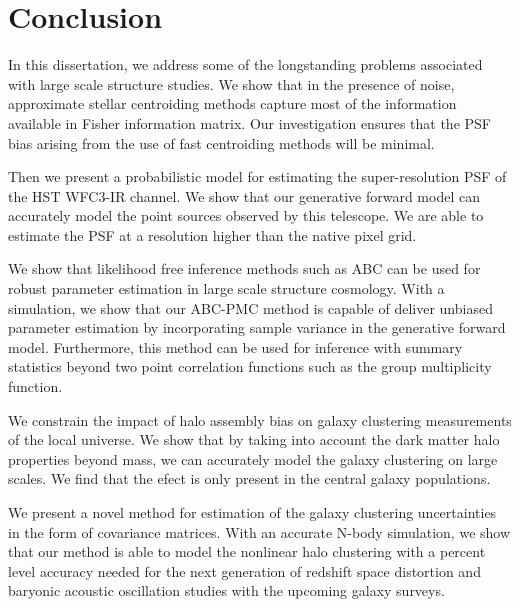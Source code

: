 \chapter*{Conclusion}

In this dissertation, we address some of the longstanding problems associated with large scale structure studies.
We show that in the presence of noise, approximate stellar centroiding methods capture most of the 
information available in Fisher information matrix. Our investigation ensures that the PSF bias arising 
from the use of fast centroiding methods will be minimal. 

Then we present a probabilistic model for estimating the super-resolution PSF of the HST WFC3-IR channel.
We show that our generative forward model can accurately model the point sources observed by this telescope. We are able 
to estimate the PSF at a resolution higher than the native pixel grid.

We show that likelihood free inference methods such as ABC can be used for robust parameter estimation 
in large scale structure cosmology. With a simulation, we show that our ABC-PMC method is capable of deliver unbiased 
parameter estimation by incorporating sample variance in the generative forward model. Furthermore, this method can be used 
for inference with summary statistics beyond two point correlation functions such as the group multiplicity function.

We constrain the impact of halo assembly bias on galaxy clustering measurements of the local universe. 
We show that by taking into account the dark matter halo properties beyond mass, we can accurately model 
the galaxy clustering on large scales. We find that the efect is only present in the central galaxy populations. 

We present a novel method for estimation of the galaxy clustering uncertainties in the form of covariance matrices. 
With an accurate N-body simulation, we show that our method is able to model the nonlinear halo clustering with a 
percent level accuracy needed for the next generation of redshift space distortion and baryonic acoustic oscillation 
studies with the upcoming galaxy surveys.

 










